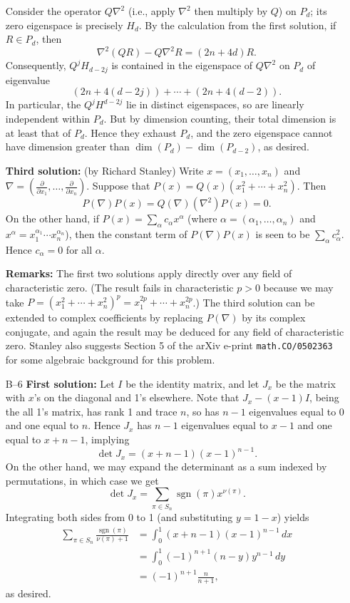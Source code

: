\documentclass[amssymb,twocolumn,pra,10pt,aps]{revtex4-1}
\DeclareMathOperator{\sgn}{sgn}
\begin{document}
\begin{itemize}
Consider the operator $Q \nabla^2$ (i.e., apply $\nabla^2$ then multiply
by $Q$) on $P_d$; its zero eigenspace is precisely $H_d$.
By the calculation from the first solution, if $R \in P_d$, then
\[
\nabla^2 (QR) - Q \nabla^2 R = (2n+4d)R.
\]
Consequently, $Q^j H_{d-2j}$ is contained in the eigenspace of $Q \nabla^2$
on $P_d$ of eigenvalue
\[
(2n+4(d-2j)) + \cdots + (2n+4(d-2)).
\]
In particular, the $Q^j H^{d-2j}$ lie in distinct eigenspaces, so are
linearly independent within $P_d$. But by dimension counting,
their total dimension is at least that of $P_d$.
Hence they exhaust $P_d$, and the zero eigenspace cannot have dimension
greater than $\dim(P_d) - \dim(P_{d-2})$, as desired.

\textbf{Third solution:}
(by Richard Stanley)
Write $x = (x_1, \dots, x_n)$ and $\nabla = (\frac{\partial}{\partial x_1},
\dots, \frac{\partial}{\partial x_n})$.
Suppose that $P(x) = Q(x)(x_1^2 + \cdots + x_n^2)$. Then
\[
P(\nabla)P(x) = Q(\nabla)(\nabla^2)P(x) =0.
\]
On the other hand,
if $P(x) = \sum_\alpha c_\alpha x^\alpha$ (where $\alpha = (\alpha_1,
\dots, \alpha_n)$ and $x^\alpha = x_1^{\alpha_1} \cdots
x_n^{\alpha_n}$), then the constant term of $P(\nabla)P(x)$
is seen to be $\sum_\alpha c_\alpha^2$. Hence $c_\alpha = 0$ for all
$\alpha$.

\textbf{Remarks:}
The first two solutions apply directly over any field of characteristic zero.
(The result fails in characteristic $p>0$ because we may take
$P = (x_1^2 + \cdots + x_n^2)^p = x_1^{2p} + \cdots + x_n^{2p}$.)
The third solution can be extended to complex coefficients
by replacing $P(\nabla)$ by its complex conjugate, and again the result
may be deduced for any field of characteristic zero.
Stanley also suggests
Section 5 of the arXiv e-print \texttt{math.CO/0502363} for
some  algebraic background for this problem.

\item[B--6]
\textbf{First solution:}
Let $I$ be the identity matrix, and let
$J_x$ be the matrix with $x$'s on the diagonal and 1's elsewhere.
Note that $J_x - (x-1)I$, being the all 1's matrix, has rank 1 and trace $n$,
so has $n-1$ eigenvalues equal to 0 and one equal to $n$.
Hence $J_x$ has $n-1$ eigenvalues equal to $x-1$ and one equal to $x+n-1$,
implying
\[
\det J_x = (x+n-1)(x-1)^{n-1}.
\]
On the other hand, we may expand the determinant as a sum indexed by
permutations, in which case we get
\[
\det J_x = \sum_{\pi \in S_n} \sgn(\pi) x^{\nu(\pi)}.
\]
Integrating both sides from 0 to 1 (and substituting $y=1-x$) yields
\begin{align*}
\sum_{\pi \in S_n} \frac{\sgn(\pi)}{\nu(\pi) + 1}
&= \int_0^1 (x+n-1)(x-1)^{n-1}\,dx \\
&= \int_0^1 (-1)^{n+1} (n-y)y^{n-1}\,dy \\
&= (-1)^{n+1} \frac{n}{n+1},
\end{align*}
as desired.


\end{itemize}
\end{document}
